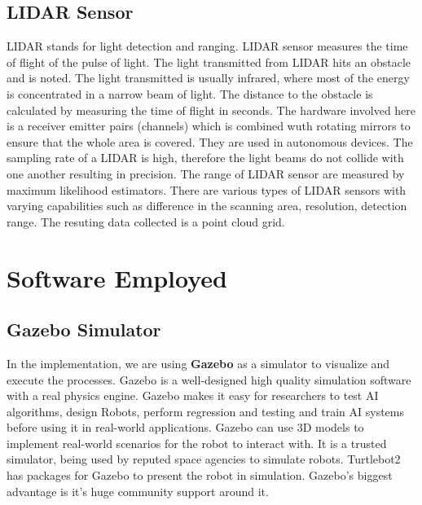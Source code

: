 \subsection{LIDAR Sensor}
LIDAR stands for light detection and ranging. LIDAR sensor measures the time of flight of the pulse of light.
The light transmitted from LIDAR hits an obstacle and is noted. The light transmitted is usually infrared, where most of the energy is concentrated
in a narrow beam of light. The distance to the obstacle is calculated by measuring the time of flight in seconds.
The hardware involved here is a receiver emitter pairs (channels) which is combined wuth rotating mirrors to ensure that the whole area is covered.
They are used in autonomous devices. The sampling rate of a LIDAR is high, therefore the light beams do not collide with one another resulting in precision.
The range of LIDAR sensor are measured by maximum likelihood estimators. There are various types of LIDAR sensors with varying capabilities such as difference in the scanning area, resolution, detection range.
The resuting data collected is a point cloud grid.
\section{Software Employed}
\subsection{Gazebo Simulator}
In the implementation, we are using \textbf{Gazebo} \cite{1389727} as a simulator to visualize and execute the processes.
Gazebo is a well-designed high quality simulation software with a real physics engine. Gazebo makes it easy for researchers to test AI algorithms, design Robots, perform regression and testing and train AI systems before 
using it in real-world applications. Gazebo can use 3D models to implement real-world scenarios for the robot to interact with. It is a trusted simulator, being used by reputed space agencies to simulate robots.
Turtlebot2 has packages for Gazebo to present the robot in simulation. Gazebo's biggest advantage is it's huge community support around it.

